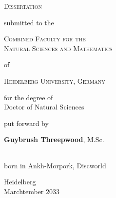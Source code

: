 

\begin{titlepage}
  \begin{center}
    \textsc{\huge Dissertation}
                \vskip 1cm
                \begin{large}
                  submitted to the\\[0.50cm]
                  \begin{Large}
                    \textsc{Combined Faculty for the\\Natural Sciences and Mathematics}\\[0.50cm]
                  \end{Large}
                  of\\[0.50cm]
                  \begin{Large}
                    \textsc{Heidelberg University, Germany}\\[0.50cm]
                  \end{Large}
                  for the degree of \\[0.5cm] 
                  Doctor of Natural Sciences
                \end{large}
    \vfill
    \begin{large}
                  put forward by\\[0.5cm]
                  \begin{LARGE}
                    \textbf{Guybrush Threepwood}, M.Sc.
                  \end{LARGE}\\[0.5cm]
                  born in Ankh-Morpork, Discworld
    \end{large}
    \vskip 2cm
    \begin{small}
      Heidelberg\\
      Marchtember 2033
    \end{small}
  \end{center}
\end{titlepage}


